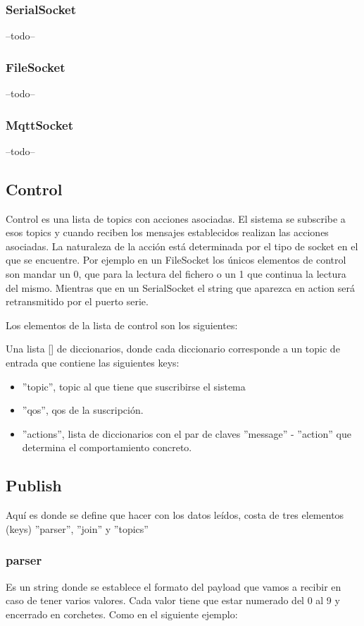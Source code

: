 \documentclass[12pt, a4paper, oneside, titlepage]{article}
\begin{document}
\subsubsection{SerialSocket}
--todo--
\subsubsection{FileSocket}
--todo--
\subsubsection{MqttSocket}
--todo--
\subsection{Control}

 Control es una lista de topics con acciones asociadas. El sistema se subscribe a esos topics y cuando reciben los mensajes establecidos realizan las acciones asociadas. La naturaleza de la acción está determinada por el tipo de socket en el que se encuentre. Por ejemplo en un FileSocket los únicos elementos de control son mandar un 0, que para la lectura del fichero o un 1 que continua la lectura del mismo. Mientras que en un SerialSocket el string que aparezca en action será retransmitido por el puerto serie.

Los elementos de la lista de control son los siguientes:

Una lista [] de diccionarios, donde cada diccionario corresponde a un topic de entrada que contiene las siguientes keys:

\begin{itemize}
\item ''topic'', topic al que tiene que suscribirse el sistema
\item ''qos'', qos de la suscripción.
\item ''actions'', lista de diccionarios con el par de claves ''message'' - ''action'' que determina el comportamiento concreto.
\end{itemize}

\subsection{Publish}

Aquí es donde se define que hacer con los datos leídos, costa de tres elementos (keys) ''parser'', ''join'' y ''topics''
 \subsubsection{parser}
 Es un string donde se establece el formato del payload que vamos a recibir en caso de tener varios valores.
 Cada valor tiene que estar numerado del 0 al 9 y encerrado en corchetes. Como en el siguiente ejemplo:
 
\end{document}
